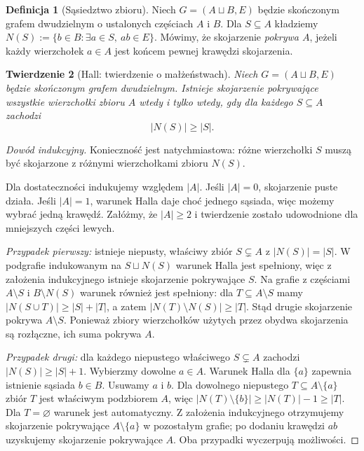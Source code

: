 \documentclass[11pt,a4paper]{report}
\numberwithin{equation}{section}
\theoremstyle{plain}
\newtheorem{twierdzenie}{Twierdzenie}[section]
\theoremstyle{definition}
\newtheorem{definicja}[twierdzenie]{Definicja}
\theoremstyle{remark}
\begin{document}
\begin{definicja}[Sąsiedztwo zbioru]
Niech $G=(A\sqcup B,E)$ będzie skończonym grafem
dwudzielnym o ustalonych częściach $A$ i $B$.
Dla $S\subseteq A$ kładziemy
$N(S):=\{b\in B:\exists a\in S,\ ab\in E\}$.
Mówimy, że skojarzenie \emph{pokrywa $A$}, jeżeli
każdy wierzchołek $a\in A$ jest końcem pewnej
krawędzi skojarzenia.
\end{definicja}

\begin{twierdzenie}[Hall: twierdzenie o małżeństwach]
\label{thm:tg-hall}
Niech $G=(A\sqcup B,E)$ będzie skończonym grafem
dwudzielnym. Istnieje skojarzenie pokrywające
wszystkie wierzchołki zbioru $A$ wtedy i tylko wtedy,
gdy dla każdego $S\subseteq A$ zachodzi
\[
|N(S)|\ge |S|.
\]
\end{twierdzenie}

\begin{proof}[Dowód indukcyjny]
Konieczność jest natychmiastowa: różne wierzchołki
$S$ muszą być skojarzone z różnymi wierzchołkami
zbioru $N(S)$.

Dla dostateczności indukujemy względem $|A|$.
Jeśli $|A|=0$, skojarzenie puste działa.
Jeśli $|A|=1$, warunek Halla daje choć jednego
sąsiada, więc możemy wybrać jedną krawędź.
Załóżmy, że $|A|\ge2$ i twierdzenie zostało
udowodnione dla mniejszych części lewych.

\emph{Przypadek pierwszy:} istnieje niepusty, właściwy
zbiór $S\subsetneq A$ z $|N(S)|=|S|$.
W podgrafie indukowanym na $S\sqcup N(S)$
warunek Halla jest spełniony, więc z założenia
indukcyjnego istnieje skojarzenie pokrywające $S$.
Na grafie z częściami $A\setminus S$
i $B\setminus N(S)$ warunek również jest spełniony:
dla $T\subseteq A\setminus S$ mamy
$|N(S\cup T)|\ge|S|+|T|$, a zatem
$|N(T)\setminus N(S)|\ge|T|$.
Stąd drugie skojarzenie pokrywa $A\setminus S$.
Ponieważ zbiory wierzchołków użytych przez obydwa
skojarzenia są rozłączne, ich suma pokrywa $A$.

\emph{Przypadek drugi:} dla każdego niepustego
właściwego $S\subsetneq A$ zachodzi
$|N(S)|\ge|S|+1$. Wybierzmy dowolne $a\in A$.
Warunek Halla dla $\{a\}$ zapewnia istnienie
sąsiada $b\in B$. Usuwamy $a$ i $b$.
Dla dowolnego niepustego $T\subseteq A\setminus\{a\}$
zbiór $T$ jest właściwym podzbiorem $A$, więc
$|N(T)\setminus\{b\}|\ge|N(T)|-1\ge|T|$.
Dla $T=\varnothing$ warunek jest automatyczny.
Z założenia indukcyjnego otrzymujemy skojarzenie
pokrywające $A\setminus\{a\}$ w pozostałym grafie;
po dodaniu krawędzi $ab$ uzyskujemy skojarzenie
pokrywające $A$.
Oba przypadki wyczerpują możliwości.
\end{proof}
\end{document}
